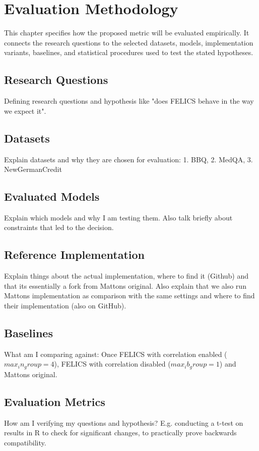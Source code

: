 \chapter{Evaluation Methodology}
This chapter specifies how the proposed metric will be evaluated empirically. It connects the research questions to the selected datasets, models, implementation variants, baselines, and statistical procedures used to test the stated hypotheses.

\section{Research Questions}
Defining research questions and hypothesis like "does FELICS behave in the way we expect it".

\section{Datasets}
Explain datasets and why they are chosen for evaluation: 1. BBQ, 2. MedQA, 3. NewGermanCredit

\section{Evaluated Models}
Explain which models and why I am testing them. Also talk briefly about constraints that led to the decision.


\section{Reference Implementation}
Explain things about the actual implementation, where to find it (Github) and that its essentially a fork from Mattons original. Also explain that we also run Mattons implementation as comparison with the same settings and where to find their implementation (also on GitHub).

\section{Baselines}
What am I comparing against: Once FELICS with correlation enabled ($max_in_group = 4$), FELICS with correlation disabled ($max_ib_group = 1$) and Mattons original.

\section{Evaluation Metrics}
How am I verifying my questions and hypothesis? E.g. conducting a t-test on results in R to check for significant changes, to practically prove backwards compatibility.

